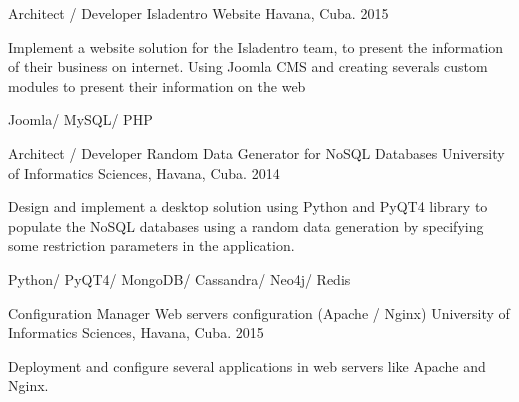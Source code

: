 


\begin{cventries}


\cventry
{Architect / Developer} %
{Isladentro Website } %
{Havana, Cuba.} %
{2015} %
{ %
\begin{cvitems}
\item {Implement a website solution for the Isladentro team, to present the information of their business on internet. Using Joomla CMS and creating severals custom modules to present their information on the web}
\item {Joomla/ MySQL/ PHP}
\end{cvitems}
}


\cventry
{Architect / Developer} %
{Random Data Generator for NoSQL Databases} %
{University of Informatics Sciences, Havana, Cuba.} %
{2014} %
{ %
\begin{cvitems}
\item {Design and implement a desktop solution using Python and PyQT4 library to populate the NoSQL databases using a random data generation by specifying some restriction parameters in the application.}
\item {Python/ PyQT4/ MongoDB/ Cassandra/ Neo4j/ Redis}
\end{cvitems}
}


\cventry
{Configuration Manager} %
{Web servers configuration (Apache / Nginx)} %
{University of Informatics Sciences, Havana, Cuba.} %
{2015} %
{ %
\begin{cvitems}
\item {Deployment and configure several applications in web servers like Apache and Nginx.}
\end{cvitems}
}


\end{cventries}
